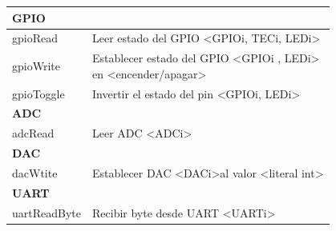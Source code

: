 \begin{longtable}[c]{ll}
\textbf{GPIO}                                 &                                                                                                                                                                                     \\ \hline
gpioRead                                      & Leer estado del GPIO \textless GPIOi, TECi, LEDi\textgreater                                                                                                                        \\
gpioWrite                                     & \makecell[ll]{Establecer estado del GPIO \textless GPIOi , LEDi\textgreater \\ en \textless encender/apagar\textgreater }                                                                              \\
gpioToggle                                    & Invertir el estado del pin \textless GPIOi, LEDi\textgreater                                                                                                                        \\ \hline
\textbf{ADC}                                  &                                                                                                                                                                                     \\ \hline
adcRead                                       & Leer ADC \textless ADCi\textgreater                                                                                                                                                 \\ \hline
\textbf{DAC}                                  &                                                                                                                                                                                     \\ \hline
dacWtite                                      & Establecer DAC \textless DACi\textgreater al valor \textless literal int\textgreater                                                                                                \\ \hline
\textbf{UART}                                 &                                                                                                                                                                                     \\ \hline
uartReadByte                                  & Recibir byte desde UART \textless UARTi\textgreater                                                                                                                                 \\

\end{longtable}
